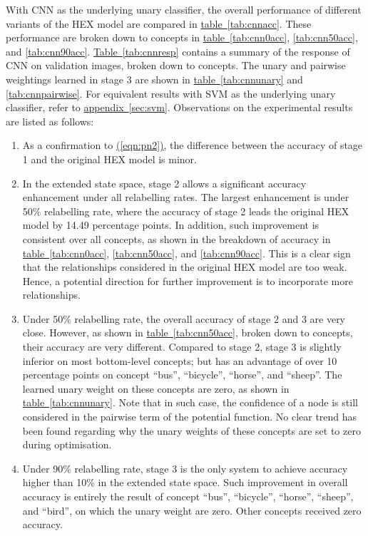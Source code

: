 \documentclass[11pt,a4paper]{article}
\begin{document}
With CNN as the underlying unary classifier, the overall performance of different variants of the HEX model are compared in \hyperref[tab:cnnacc]{table~\ref{tab:cnnacc}}. These performance are broken down to concepts in \hyperref[tab:cnn0acc]{table~\ref{tab:cnn0acc}}, \ref{tab:cnn50acc}, and \ref{tab:cnn90acc}. \hyperref[tab:cnnresp]{Table~\ref{tab:cnnresp}} contains a summary of the response of CNN on validation images, broken down to concepts. The unary and pairwise weightings learned in stage 3 are shown in \hyperref[tab:cnnunary]{table~\ref{tab:cnnunary}} and \ref{tab:cnnpairwise}. For equivalent results with SVM as the underlying unary classifier, refer to \hyperref[sec:svm]{appendix~\ref{sec:svm}}. Observations on the experimental results are listed as follows:
\begin{enumerate}
\item As a confirmation to \hyperref[eqn:pn2]{(\ref{eqn:pn2})}, the difference between the accuracy of stage 1 and the original HEX model is minor.
\item In the extended state space, stage 2 allows a significant accuracy enhancement under all relabelling rates. The largest enhancement is under 50\% relabelling rate, where the accuracy of stage 2 leads the original HEX model by 14.49 percentage points. In addition, such improvement is consistent over all concepts, as shown in the breakdown of accuracy in \hyperref[tab:cnn0acc]{table~\ref{tab:cnn0acc}}, \ref{tab:cnn50acc}, and \ref{tab:cnn90acc}. This is a clear sign that the relationships considered in the original HEX model are too weak. Hence, a potential direction for further improvement is to incorporate more relationships.
\item Under 50\% relabelling rate, the overall accuracy of stage 2 and 3 are very close. However, as shown in \hyperref[tab:cnn0acc]{table~\ref{tab:cnn50acc}}, broken down to concepts, their accuracy are very different. Compared to stage 2, stage 3 is slightly inferior on most bottom-level concepts; but has an advantage of over 10 percentage points on concept ``bus'', ``bicycle'', ``horse'', and ``sheep''. The learned unary weight on these concepts are zero, as shown in \hyperref[tab:cnnunary]{table~\ref{tab:cnnunary}}. Note that in such case, the confidence of a node is still considered in the pairwise term of the potential function. No clear trend has been found regarding why the unary weights of these concepts are set to zero during optimisation.
\item Under 90\% relabelling rate, stage 3 is the only system to achieve accuracy higher than 10\% in the extended state space. Such improvement in overall accuracy is entirely the result of concept ``bus'', ``bicycle'', ``horse'', ``sheep'', and ``bird'', on which the unary weight are zero. Other concepts received zero accuracy.
\end{enumerate}
\end{document}
